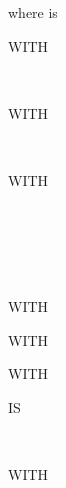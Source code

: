 where  is

\begin{syntax}[\miscextcolour]
  \begin{0-1}
    WITH
    \begin{1=}
       \\
    \end{1=}
  \end{0-1}

  \begin{0-1}
    WITH
    \begin{1=}
       \\
    \end{1=}
  \end{0-1}

  \begin{0-1}
    WITH
    \begin{1=}
       \\
       \\
       \\
       \\
    \end{1=}
  \end{0-1}

  \begin{0-1}
    WITH 
  \end{0-1}

  \begin{0-1}
    WITH 
  \end{0-1}

  \begin{0-1}
    WITH 
    \begin{0-1}
       IS
      \begin{1=}
        \identifier \\
        \literal
      \end{1=}
    \end{0-1}
  \end{0-1}

  \begin{0-1}
    WITH
    \begin{1=}
       \\
       \\
    \end{1=}
  \end{0-1}



\end{syntax}
